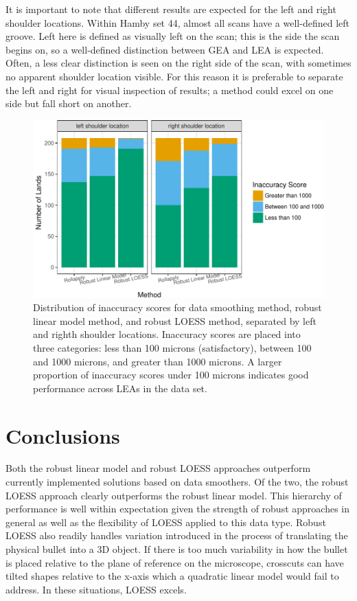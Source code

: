\documentclass[]{article}
\begin{document}
It is important to note that different results are expected for the left
and right shoulder locations. Within Hamby set 44, almost all scans have
a well-defined left groove. Left here is defined as visually left on the
scan; this is the side the scan begins on, so a well-defined distinction
between GEA and LEA is expected. Often, a less clear distinction is seen
on the right side of the scan, with sometimes no apparent shoulder
location visible. For this reason it is preferable to separate the left
and right for visual inspection of results; a method could excel on one
side but fall short on another.

\begin{figure}
\centering
\includegraphics{writeup_files/figure-latex/unnamed-chunk-6-1.pdf}
\caption{Distribution of inaccuracy scores for data smoothing method,
robust linear model method, and robust LOESS method, separated by left
and righth shoulder locations. Inaccuracy scores are placed into three
categories: less than 100 microns (satisfactory), between 100 and 1000
microns, and greater than 1000 microns. A larger proportion of
inaccuracy scores under 100 microns indicates good performance across
LEAs in the data set.}
\end{figure}

\section{Conclusions}

Both the robust linear model and robust LOESS approaches outperform
currently implemented solutions based on data smoothers. Of the two, the
robust LOESS approach clearly outperforms the robust linear model. This
hierarchy of performance is well within expectation given the strength
of robust approaches in general as well as the flexibility of LOESS
applied to this data type. Robust LOESS also readily handles variation
introduced in the process of translating the physical bullet into a 3D
object. If there is too much variability in how the bullet is placed
relative to the plane of reference on the microscope, crosscuts can have
tilted shapes relative to the x-axis which a quadratic linear model
would fail to address. In these situations, LOESS excels.
\end{document}
